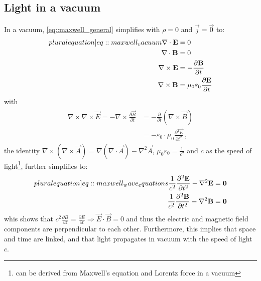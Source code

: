 \subsection{Light in a vacuum}
%
In a vacuum, \cref{eq::maxwell_general} simplifies with $\rho = 0$ and $\vec{j} = \vec{0}$ to:
%
\begin{align}
\begin{split} \label[pluralequation]{eq::maxwell_vacuum}
  \nabla \cdot \vec{E} &= 0 \quad\\
  \nabla \cdot \vec{B} &= 0 \quad\\
  \nabla \times \vec{E} &= -\frac{\partial\vec B}{\partial t}\\
  \nabla \times \vec{B} &= \mu_0\varepsilon_0 \frac{\partial\vec E}{\partial t}
  \end{split}
\end{align}
%
with
\begin{align}
\begin{split}
    \nabla \times \nabla \times \vec{E} = -\nabla \times \frac{\partial \vec{B}} {\partial t} &= -\frac{\partial} {\partial t} \left( \nabla \times  \vec{B} \right)\\
    &= -\varepsilon_0 \cdot \mu_0 \frac{\partial^2 \vec{E}}{\partial t^2} \, ,
\end{split}
\end{align}
%
the identity $\nabla \times \left( \nabla \times \vec{A} \right) = \nabla(\nabla \cdot \vec{A}) - \nabla^{2}\vec{A}$, $\mu_0\varepsilon_0 = \frac{1}{c^2}$ and $c$ as the speed of light\footnote{can be derived from Maxwell's equation and Lorentz force in a vacuum}, further simplifies to:
%
\begin{align}
\begin{split} \label[pluralequation]{eq::maxwell_wave_equations}
  \frac{1}{c^2} \frac{\partial^2 \vec{E}}{\partial t^2} - \nabla^2 \vec{E} &= \vec{0} \\
  \frac{1}{c^2} \frac{\partial^2 \vec{B}}{\partial t^2} - \nabla^2 \vec{B} &= \vec{0}
\end{split}
\end{align}
%
whis shows that $c^2 \frac{\partial B} {\partial z} = \frac{\partial E}{\partial t} \Rightarrow \vec{E} \cdot \vec{B} = 0$ and thus the electric and magnetic field components are perpendicular to each other.
Furthermore, this implies that space and time are linked, and that light propagates in vacuum with the speed of light $c$.
% 
% 
%
